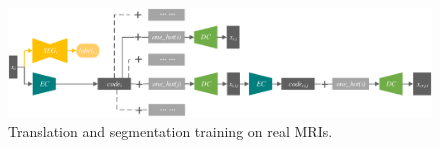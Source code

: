\documentclass{ecai}
\begin{document}
\begin{figure}
	\centering
	\includegraphics[width=1.75\columnwidth]{figures/trans_train}
	\caption{Translation and segmentation training on real MRIs.}
	\label{trans_train}
\end{figure}

%	
\end{document}
